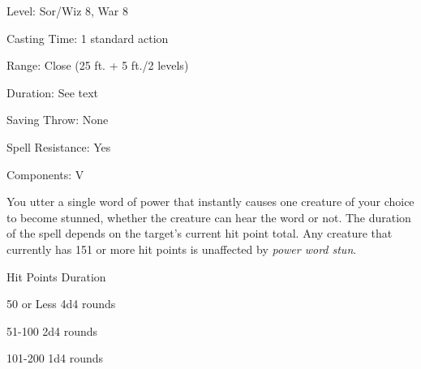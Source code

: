 
\begin{description*}
\item[Level:] Sor/Wiz 8, War 8
\item[Casting Time:] 1 standard action
\item[Range:] Close (25 ft. + 5 ft./2 levels)
\item[Duration:] See text
\item[Saving Throw:] None
\item[Spell Resistance:] Yes
\item[Components:] V
\end{description*}

You utter a single word of power that instantly causes one creature of your choice
to become stunned, whether the creature can hear the word or not. The duration
of the spell depends on the target's current hit point total. Any creature that
currently has 151 or more hit points is unaffected by \textit{power word stun}.
\begin{description*}
\item[Hit Points] Duration
\item[50 or Less] 4d4 rounds
\item[51-100] 2d4 rounds
\item[101-200] 1d4 rounds
\end{description*}